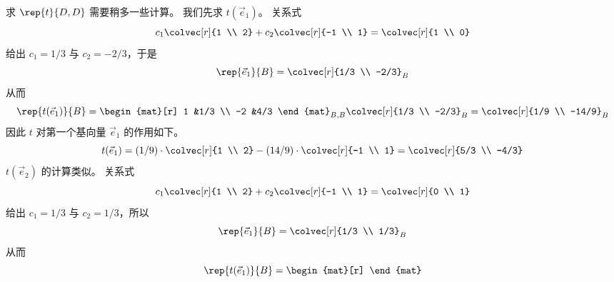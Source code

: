 \begin{exercises}
\begin{answer}
        求 \( \rep{t}{D,D} \) 需要稍多一些计算。
        我们先求 \( t(\vec{e}_1) \)。
        关系式
        \begin{equation*}
          c_1\colvec[r]{1 \\ 2}+c_2\colvec[r]{-1 \\ 1}=\colvec[r]{1 \\ 0}
        \end{equation*}
        给出 \( c_1=1/3 \) 与 \( c_2=-2/3 \)，于是 
        \begin{equation*}
          \rep{\vec{e}_1}{B}=\colvec[r]{1/3 \\ -2/3}_B
        \end{equation*}
        从而
        \begin{equation*}
           \rep{t(\vec{e}_1)}{B}=
                  \begin{mat}[r]
                     1  &1/3  \\
                    -2  &4/3
                  \end{mat}_{B,B}
                  \colvec[r]{1/3 \\ -2/3}_B
                  =
                  \colvec[r]{1/9 \\ -14/9}_B
        \end{equation*}
        因此 $t$ 对第一个基向量 $\vec{e}_1$ 的作用如下。
        \begin{equation*}
          t(\vec{e}_1)
          =(1/9)\cdot\colvec[r]{1 \\ 2}-(14/9)\cdot\colvec[r]{-1 \\ 1}
          =\colvec[r]{5/3 \\ -4/3}      
        \end{equation*}
        \( t(\vec{e}_2) \) 的计算类似。
        关系式
        \begin{equation*}
          c_1\colvec[r]{1 \\ 2}+c_2\colvec[r]{-1 \\ 1}=\colvec[r]{0 \\ 1}
        \end{equation*}
        给出 \( c_1=1/3 \) 与 \( c_2=1/3 \)，所以
        \begin{equation*}
          \rep{\vec{e}_1}{B}=\colvec[r]{1/3 \\ 1/3}_B      
        \end{equation*}
        从而
        \begin{equation*}
          \rep{t(\vec{e}_1)}{B}=
                  \begin{mat}[r]

\end{mat}
\end{equation*}
\end{answer}
\end{exercises}
